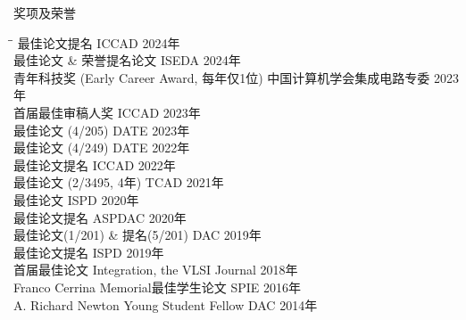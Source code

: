 
\begin{rSection}{奖项及荣誉}
\begin{tabbing}
\hspace{3.3in}\= \hspace{2.7in}\= \kill
最佳论文提名 \> ICCAD \> { 2024年 } \\
最佳论文 \& 荣誉提名论文 \> ISEDA \> { 2024年 } \\
青年科技奖 (Early Career Award, 每年仅1位) \> 中国计算机学会集成电路专委 \> { 2023年 } \\
首届最佳审稿人奖 \> ICCAD \> { 2023年 } \\
最佳论文 (4/205) \> DATE \> { 2023年 } \\
最佳论文 (4/249) \> DATE \> { 2022年 } \\
最佳论文提名 \> ICCAD \> { 2022年 } \\
最佳论文 (2/3495, 4年) \> TCAD \> { 2021年 } \\
最佳论文 \> ISPD \> { 2020年 } \\
最佳论文提名 \> ASPDAC \> { 2020年 } \\
最佳论文(1/201) \& 提名(5/201) \> DAC \> { 2019年 } \\
最佳论文提名 \> ISPD \> { 2019年 } \\
首届最佳论文 \> Integration, the VLSI Journal \> { 2018年 } \\
Franco Cerrina Memorial最佳学生论文 \> SPIE \> { 2016年 } \\
A. Richard Newton Young Student Fellow \> DAC \> { 2014年 } \\
\end{tabbing}
\end{rSection}

